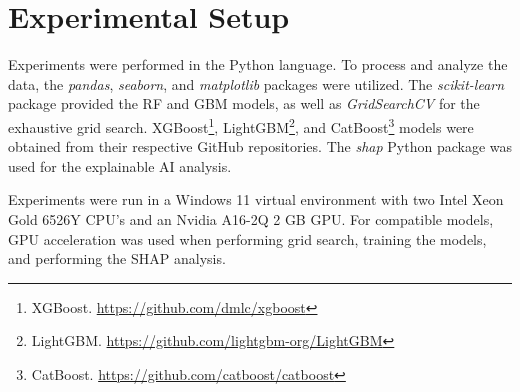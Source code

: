 \FloatBarrier

\section{Experimental Setup}

Experiments were performed in the Python language. To process and analyze the data, the \emph{pandas}, \emph{seaborn}, and \emph{matplotlib} packages were utilized. The \emph{scikit-learn} %
package provided the RF and GBM models, as well as \emph{GridSearchCV} for the exhaustive grid search. XGBoost\footnote{XGBoost. \url{https://github.com/dmlc/xgboost}}, LightGBM\footnote{LightGBM. \url{https://github.com/lightgbm-org/LightGBM}}, and CatBoost\footnote{CatBoost. \url{https://github.com/catboost/catboost}} models were obtained from their respective GitHub repositories. The \emph{shap} Python package was used for the explainable AI analysis.

Experiments were run in a Windows 11 virtual environment with two Intel Xeon Gold 6526Y CPU's and an Nvidia A16-2Q 2 GB GPU. For compatible models, GPU acceleration was used when performing grid search, training the models, and performing the SHAP analysis.